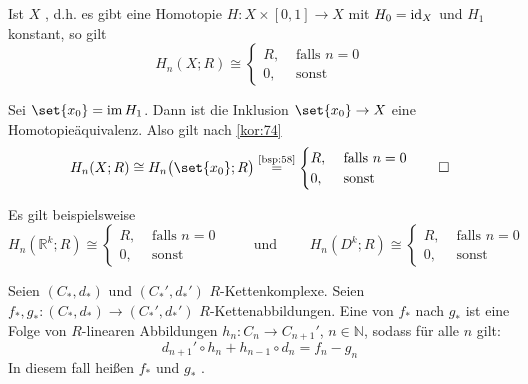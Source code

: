 \begin{korollar}[{name=[Homologie eines kontrahierbaren Raumes]},label=kor:75]
	Ist $X$ , d.h. es gibt eine Homotopie $H \colon X \times [0,1] \to X$ mit $H_0 =\operatorname{id}_X$ und $H_1$ konstant, so gilt 
	\[
		H_n(X;R) \cong \begin{cases}
			R, &\text{ falls }n=0\\
			0, &\text{ sonst}
		\end{cases}
	\]
\end{korollar}
\begin{beweis}
	Sei $\set{x_0} =\im H_1$. Dann ist die Inklusion $\set{x_0} \to X$ eine Homotopieäquivalenz. Also gilt nach \autoref{kor:74}
	\[
		H_n(X;R) \cong H_n \enbrace[\big]{\set{x_0};R} \StackText{\ref{bsp:58}}{=} \begin{cases}
			R, &\text{ falls }n=0\\
			0, &\text{ sonst}
		\end{cases} \qedhere
	\]
\end{beweis}

Es gilt beispielsweise
\[
	H_n(\mathbb{R}^k;R) \cong \begin{cases}
		R, &\text{ falls }n=0\\
		0, &\text{ sonst}
	\end{cases} \qquad \text{ und } \qquad 
	H_n(D^k;R) \cong \begin{cases}
		R, &\text{ falls }n=0\\
		0, &\text{ sonst}
	\end{cases}
\]

\begin{definition}[{name=[Kettenhomotopie]},label=def:76]
	Seien $(C_*,d_*)$ und $(C_*',d_*')$ $R$-Kettenkomplexe. 
	Seien $f_*,g_* \colon (C_*,d_*) \to (C_*',d_*')$ $R$-Kettenabbildungen.
	Eine  von $f_*$ nach $g_*$ ist eine Folge von $R$-linearen Abbildungen $h_n \colon C_n \to C_{n+1}'$, $n \in \mathbb{N}$, sodass für alle $n$ gilt:
	\[
		d_{n+1}' \circ h_n + h_{n-1} \circ d_n = f_n - g_n
	\] 
	In diesem fall heißen $f_*$ und $g_*$ .
\end{definition}
\begin{figure}[th]
\end{figure}

